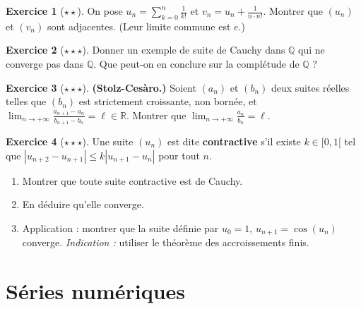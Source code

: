 \documentclass[12pt,a4paper,openany]{book}
\theoremstyle{definition}
\newtheorem{exercice}{Exercice}[chapter]
\newcommand{\Q}{\mathbb{Q}}
\newcommand{\R}{\mathbb{R}}
\newcommand{\abs}[1]{\left\lvert #1 \right\rvert}
\begin{document}
\begin{exercice}[$\star\star$]\label{exo:suites-adjacentes-ex}
  On pose $u_n = \sum_{k=0}^{n} \frac{1}{k!}$ et $v_n = u_n + \frac{1}{n \cdot n!}$.
  Montrer que $(u_n)$ et $(v_n)$ sont adjacentes. (Leur limite commune est $e$.)
\end{exercice}

\begin{exercice}[$\star\star\star$]\label{exo:cauchy-pas-cv-Q}
  Donner un exemple de suite de Cauchy dans $\Q$ qui ne converge pas dans $\Q$.
  Que peut-on en conclure sur la complétude de $\Q$ ?
\end{exercice}

\begin{exercice}[$\star\star\star$]\label{exo:stolz-cesaro}
  \textbf{(Stolz-Cesàro.)} Soient $(a_n)$ et $(b_n)$ deux suites réelles telles que
  $(b_n)$ est strictement croissante, non bornée, et
  $\lim_{n \to +\infty} \frac{a_{n+1} - a_n}{b_{n+1} - b_n} = \ell \in \R$.
  Montrer que $\lim_{n \to +\infty} \frac{a_n}{b_n} = \ell$.
\end{exercice}

\begin{exercice}[$\star\star\star$]\label{exo:suite-contractive}
  Une suite $(u_n)$ est dite \textbf{contractive} s'il existe $k \in [0, 1[$ tel que
  $\abs{u_{n+2} - u_{n+1}} \leq k\abs{u_{n+1} - u_n}$ pour tout $n$.
  \begin{enumerate}[label=(\alph*)]
    \item Montrer que toute suite contractive est de Cauchy.
    \item En déduire qu'elle converge.
    \item Application : montrer que la suite définie par $u_0 = 1$,
      $u_{n+1} = \cos(u_n)$ converge. \textit{Indication :} utiliser le théorème des accroissements finis.
  \end{enumerate}
\end{exercice}



\chapter{Séries numériques}\label{chap:series}
\end{document}
